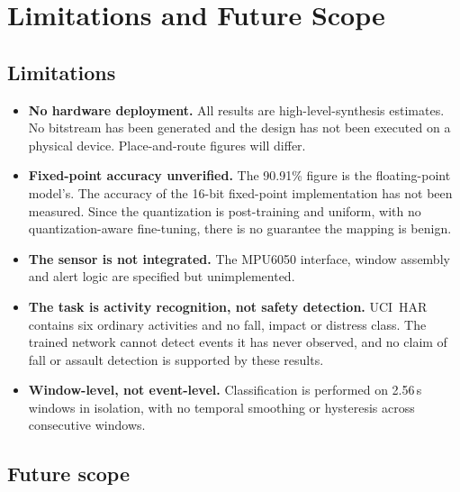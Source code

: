\documentclass[11pt,a4paper]{article}
\begin{document}
\section{Limitations and Future Scope}
\label{sec:limitations}

\subsection{Limitations}

\begin{itemize}
  \item \textbf{No hardware deployment.} All results are high-level-synthesis
        estimates. No bitstream has been generated and the design has not been
        executed on a physical device. Place-and-route figures will differ.
  \item \textbf{Fixed-point accuracy unverified.} The 90.91\% figure is the
        floating-point model's. The accuracy of the 16-bit fixed-point
        implementation has not been measured. Since the quantization is
        post-training and uniform, with no quantization-aware fine-tuning,
        there is no guarantee the mapping is benign.
  \item \textbf{The sensor is not integrated.} The MPU6050 interface, window
        assembly and alert logic are specified but unimplemented.
  \item \textbf{The task is activity recognition, not safety detection.}
        UCI~HAR contains six ordinary activities and no fall, impact or
        distress class. The trained network cannot detect events it has never
        observed, and no claim of fall or assault detection is supported by
        these results.
  \item \textbf{Window-level, not event-level.} Classification is performed on
        2.56\,s windows in isolation, with no temporal smoothing or
        hysteresis across consecutive windows.
\end{itemize}

\subsection{Future scope}
\end{document}
